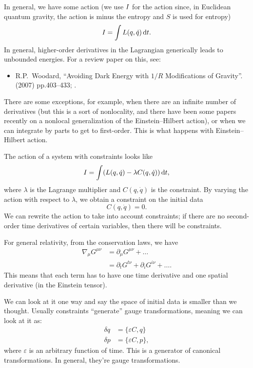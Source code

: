 In general, we have some action (we use $I$ for the action since,
in Euclidean quantum gravity, the action is minus the entropy and $S$ is
used for entropy)
\begin{equation}
I = \int L(q,\dot{q})\,\mathrm{d} t.
\end{equation}
In general, higher-order derivatives in the Lagrangian generically leads
to unbounded energies. For a review paper on this, see:
\begin{itemize}
\item R.P.~Woodard,
  ``Avoiding Dark Energy with $1/R$ Modifications of Gravity''.
    (2007) pp.403--433; .\\
{\tt{}}
\end{itemize}
There are some exceptions, for example, when there are an infinite
number of derivatives (but this is a sort of nonlocality, and there have
been some papers recently on a nonlocal generalization of the
Einstein--Hilbert action), or when we can integrate by parts to get to
first-order. This is what happens with Einstein--Hilbert action.

The action of a system with constraints looks like
\begin{equation}
I = \int(L(q,\dot{q}) - \lambda C(q,\dot{q}))\,\mathrm{d} t,
\end{equation}
where $\lambda$ is the Lagrange multiplier and $C(q,\dot{q})$ is the
constraint. By varying the action with respect to $\lambda$, we obtain a
constraint on the initial data
\begin{equation}
C(q,\dot{q})=0.
\end{equation}
We can rewrite the action to take into account constraints; if there are
no second-order time derivatives of certain variables, then there will
be constraints.

For general relativity, from the conservation laws, we have
\begin{subequations}
  \begin{align}
    \nabla_{\mu}G^{\mu\nu} &= \partial_{\mu}G^{\mu\nu} + \dots\\
    &= \partial_{t}G^{t\nu} + \partial_{i}G^{i\nu} + \dots.
  \end{align}
\end{subequations}
This means that each term has to have one time derivative and one
spatial derivative (in the Einstein tensor).

We can look at it one way and say the space of initial data is smaller
than we thought. Usually constraints ``generate'' gauge transformations,
meaning we can look at it as:
\begin{subequations}
  \begin{align}
    \delta q &= \{\varepsilon C,q\}\\
    \delta p &= \{\varepsilon C,p\},
  \end{align}
\end{subequations}
where $\varepsilon$ is an arbitrary function of time. This is a
generator of canonical transformations. In general, they're gauge
transformations.

